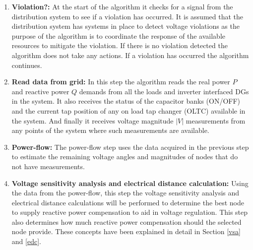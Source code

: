 \begin{enumerate}
    \item \textbf{Violation?:} At the start of the algorithm it checks for a signal from the distribution system to see if a violation has occurred. It is assumed that the distribution system has systems in place to detect voltage violations as the purpose of the algorithm is to coordinate the response of the available resources to mitigate the violation. If there is no violation detected the algorithm does not take any actions. If a violation has occurred the algorithm continues.
    
    \item \textbf{Read data from grid:} In this step the algorithm reads the real power $P$ and reactive power $Q$ demands from all the loads and inverter interfaced DGs in the system. It also receives the status of the capacitor banks (ON/OFF) and the current tap position of any on load tap changer (OLTC) available in the system. And finally it receives voltage magnitude $|V|$ measurements from any points of the system where such measurements are available.
    
    \item \textbf{Power-flow:} The power-flow step uses the data acquired in the previous step to estimate the remaining voltage angles and magnitudes of nodes that do not have measurements. 
    
    \item \textbf{Voltage sensitivity analysis and electrical distance calculation:} Using the data from the power-flow, this step the voltage sensitivity analysis and electrical distance calculations will be performed to determine the best node to supply reactive power compensation to aid in voltage regulation. This step also determines how much reactive power compensation should the selected node provide. These concepts have been explained in detail in Section \ref{vsa} and \ref{edc}.
    

\end{enumerate}

